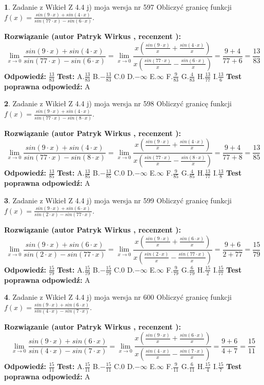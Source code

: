 \documentclass[12pt, a4paper]{article}
\theoremstyle{definition} %
\newtheorem{zad}{}
\newcommand{\zadStart}[1]{\begin{zad}#1\newline}
\newcommand{\zadStop}{\end{zad}}
\newcommand{\rozwStart}[2]{\noindent \textbf{Rozwiązanie (autor #1 , recenzent #2): }\newline}
\newcommand{\rozwStop}{\newline}
\newcommand{\odpStart}{\noindent \textbf{Odpowiedź:}\newline}
\newcommand{\odpStop}{\newline}
\newcommand{\testStart}{\noindent \textbf{Test:}\newline}
\newcommand{\testStop}{\newline}
\newcommand{\kluczStart}{\noindent \textbf{Test poprawna odpowiedź:}\newline}
\newcommand{\kluczStop}{\newline}
\begin{document}
\zadStart{Zadanie z Wikieł Z 4.4 j) moja wersja nr 597}
Obliczyć granicę funkcji $f(x)=\frac{sin(9\cdot x) +sin(4\cdot x)}{sin(77\cdot x) -sin(6\cdot x)}$.
\zadStop
\rozwStart{Patryk Wirkus}{}
$$\lim\limits_{x\to 0}\frac{sin(9\cdot x) +sin(4\cdot x)}{sin(77\cdot x) -sin(6\cdot x)}=\lim\limits_{x\to 0}\frac{x(\frac{sin(9\cdot x)}{x}+\frac{sin(4\cdot x)}{x})}{x(\frac{sin(77\cdot x)}{x}-\frac{sin(6\cdot x)}{x})}=\frac{9+4}{77+6} = \frac{13}{83}$$
\rozwStop
\odpStart
$\frac{13}{83}$
\odpStop
\testStart
A.$\frac{13}{83}$
B.$-\frac{13}{83}$
C.$0$
D.$-\infty$
E.$\infty$
F.$\frac{9}{83}$
G.$\frac{4}{83}$
H.$\frac{13}{77}$
I.$\frac{13}{6}$
\testStop
\kluczStart
A
\kluczStop



\zadStart{Zadanie z Wikieł Z 4.4 j) moja wersja nr 598}
Obliczyć granicę funkcji $f(x)=\frac{sin(9\cdot x) +sin(4\cdot x)}{sin(77\cdot x) -sin(8\cdot x)}$.
\zadStop
\rozwStart{Patryk Wirkus}{}
$$\lim\limits_{x\to 0}\frac{sin(9\cdot x) +sin(4\cdot x)}{sin(77\cdot x) -sin(8\cdot x)}=\lim\limits_{x\to 0}\frac{x(\frac{sin(9\cdot x)}{x}+\frac{sin(4\cdot x)}{x})}{x(\frac{sin(77\cdot x)}{x}-\frac{sin(8\cdot x)}{x})}=\frac{9+4}{77+8} = \frac{13}{85}$$
\rozwStop
\odpStart
$\frac{13}{85}$
\odpStop
\testStart
A.$\frac{13}{85}$
B.$-\frac{13}{85}$
C.$0$
D.$-\infty$
E.$\infty$
F.$\frac{9}{85}$
G.$\frac{4}{85}$
H.$\frac{13}{77}$
I.$\frac{13}{8}$
\testStop
\kluczStart
A
\kluczStop



\zadStart{Zadanie z Wikieł Z 4.4 j) moja wersja nr 599}
Obliczyć granicę funkcji $f(x)=\frac{sin(9\cdot x) +sin(6\cdot x)}{sin(2\cdot x) -sin(77\cdot x)}$.
\zadStop
\rozwStart{Patryk Wirkus}{}
$$\lim\limits_{x\to 0}\frac{sin(9\cdot x) +sin(6\cdot x)}{sin(2\cdot x) -sin(77\cdot x)}=\lim\limits_{x\to 0}\frac{x(\frac{sin(9\cdot x)}{x}+\frac{sin(6\cdot x)}{x})}{x(\frac{sin(2\cdot x)}{x}-\frac{sin(77\cdot x)}{x})}=\frac{9+6}{2+77} = \frac{15}{79}$$
\rozwStop
\odpStart
$\frac{15}{79}$
\odpStop
\testStart
A.$\frac{15}{79}$
B.$-\frac{15}{79}$
C.$0$
D.$-\infty$
E.$\infty$
F.$\frac{9}{79}$
G.$\frac{6}{79}$
H.$\frac{15}{2}$
I.$\frac{15}{77}$
\testStop
\kluczStart
A
\kluczStop



\zadStart{Zadanie z Wikieł Z 4.4 j) moja wersja nr 600}
Obliczyć granicę funkcji $f(x)=\frac{sin(9\cdot x) +sin(6\cdot x)}{sin(4\cdot x) -sin(7\cdot x)}$.
\zadStop
\rozwStart{Patryk Wirkus}{}
$$\lim\limits_{x\to 0}\frac{sin(9\cdot x) +sin(6\cdot x)}{sin(4\cdot x) -sin(7\cdot x)}=\lim\limits_{x\to 0}\frac{x(\frac{sin(9\cdot x)}{x}+\frac{sin(6\cdot x)}{x})}{x(\frac{sin(4\cdot x)}{x}-\frac{sin(7\cdot x)}{x})}=\frac{9+6}{4+7} = \frac{15}{11}$$
\rozwStop
\odpStart
$\frac{15}{11}$
\odpStop
\testStart
A.$\frac{15}{11}$
B.$-\frac{15}{11}$
C.$0$
D.$-\infty$
E.$\infty$
F.$\frac{9}{11}$
G.$\frac{6}{11}$
H.$\frac{15}{4}$
I.$\frac{15}{7}$
\testStop
\kluczStart
A
\kluczStop
\end{document}
